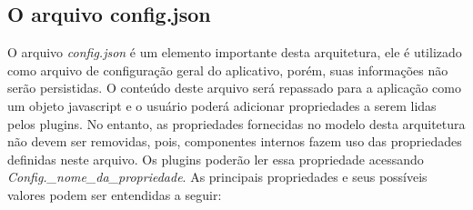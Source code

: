 \subsection{O arquivo config.json}\label{sec:solucao-desenvolvida}
O arquivo \textit{config.json} é um elemento importante desta arquitetura, ele é utilizado como arquivo de configuração geral do aplicativo, porém, suas informações não serão persistidas. O conteúdo deste arquivo será repassado para a aplicação como um objeto javascript e o usuário poderá adicionar propriedades a serem lidas pelos plugins. No entanto, as propriedades fornecidas no modelo desta arquitetura não devem ser removidas, pois, componentes internos fazem uso das propriedades definidas neste arquivo. Os plugins poderão ler essa propriedade acessando \textit{Config.\_nome\_da\_propriedade}. As principais propriedades e seus possíveis valores podem ser entendidas a seguir:

